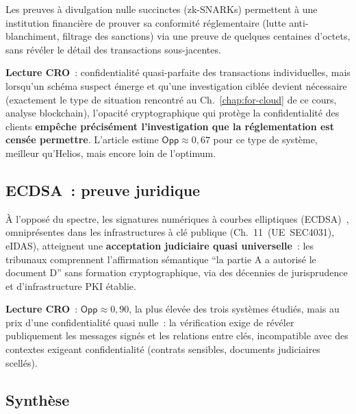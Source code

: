 Les preuves à divulgation nulle succinctes (zk-SNARKs) permettent
à une institution financière de prouver sa conformité réglementaire
(lutte anti-blanchiment, filtrage des sanctions) via une preuve
de quelques centaines d'octets, sans révéler le détail des
transactions sous-jacentes.

\textbf{Lecture CRO}~: confidentialité quasi-parfaite des
transactions individuelles, mais lorsqu'un schéma suspect émerge
et qu'une investigation ciblée devient nécessaire (exactement le
type de situation rencontré au Ch.~\ref{chap:for-cloud} de ce
cours, analyse blockchain), l'opacité cryptographique qui protège
la confidentialité des clients \textbf{empêche précisément
l'investigation que la réglementation est censée permettre}.
L'article estime $\mathsf{Opp} \approx 0{,}67$ pour ce type de
système, meilleur qu'Helios, mais encore loin de l'optimum.

\subsection{ECDSA~: preuve juridique}

À l'opposé du spectre, les signatures numériques à courbes
elliptiques (ECDSA)~\cite{johnson2001ecdsa}, omniprésentes dans
les infrastructures à clé publique (Ch.~11~(UE~SEC4031),
eIDAS), atteignent une \textbf{acceptation judiciaire quasi
universelle}~: les tribunaux comprennent l'affirmation sémantique
``la partie A a autorisé le document D'' sans formation
cryptographique, via des décennies de jurisprudence et
d'infrastructure PKI établie.

\textbf{Lecture CRO}~: $\mathsf{Opp} \approx 0{,}90$, la plus
élevée des trois systèmes étudiés, mais au prix d'une
confidentialité quasi nulle~: la vérification exige de révéler
publiquement les messages signés et les relations entre clés,
incompatible avec des contextes exigeant confidentialité
(contrats sensibles, documents judiciaires scellés).

\subsection{Synthèse}

